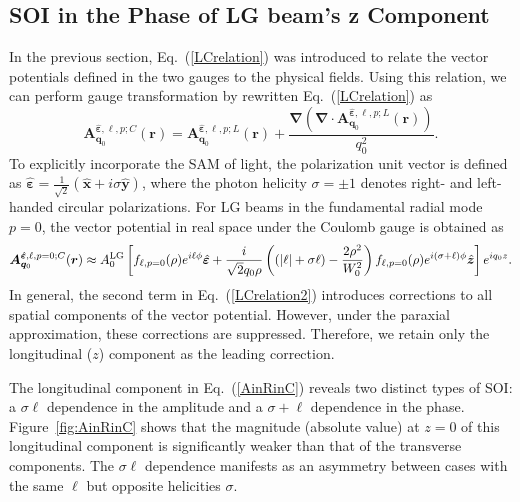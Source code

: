 %
%
%
%
%
%

\subsection{SOI in the Phase of LG beam's z Component}

In the previous section, Eq.~(\ref{LCrelation}) was introduced to relate the vector potentials defined in the two gauges to the physical fields. Using this relation, we can perform gauge transformation by rewritten Eq.~(\ref{LCrelation}) as
\begin{equation}
\boldsymbol{A}^{\hat{\boldsymbol{\varepsilon}}, \ell, p; C}_{\boldsymbol{q}_0}(\boldsymbol{r})
=
\boldsymbol{A}^{\hat{\boldsymbol{\varepsilon}}, \ell, p; L}_{\boldsymbol{q}_0}(\boldsymbol{r})
+
\frac{\boldsymbol{\nabla}
\left(
\boldsymbol{\nabla}\cdot
\boldsymbol{A}^{\hat{\boldsymbol{\varepsilon}}, \ell, p; L}_{\boldsymbol{q}_0}(\boldsymbol{r})
\right)}
{q_0^2}.
\label{LCrelation2}
\end{equation}
To explicitly incorporate the SAM of light, the polarization unit vector is defined as $\hat{\boldsymbol{\varepsilon}}=\frac{1}{\sqrt{2}}
\left(\hat{\boldsymbol{x}}+i\sigma \hat{\boldsymbol{y}}\right)$, where the photon helicity $\sigma=\pm1$ denotes right- and left-handed circular polarizations. For LG beams in the fundamental radial mode $p=0$, the vector potential in real space under the Coulomb gauge is obtained as
\begin{equation}
\boldsymbol{A}^{\hat{\boldsymbol{\varepsilon}}, \ell, p=0; C}_{\boldsymbol{q}_0}(\boldsymbol{r})
\approx
A^{\rm LG}_0
\left[
f_{\ell,p=0}(\rho)e^{i\ell \phi}\hat{\boldsymbol{\varepsilon}}
+
\frac{i}{\sqrt{2}q_0\rho}
\left(
(|\ell|+\sigma \ell)-\frac{2\rho^2}{W_0^2}
\right)
f_{\ell,p=0}(\rho)
e^{i(\sigma+\ell)\phi}
\hat{\boldsymbol{z}}
\right]
e^{i q_0 z}.
\label{AinRinC}
\end{equation}
In general, the second term in Eq.~(\ref{LCrelation2}) introduces corrections to all spatial components of the vector potential. However, under the paraxial approximation, these corrections are suppressed. Therefore, we retain only the longitudinal ($z$) component as the leading correction.

The longitudinal component in Eq.~(\ref{AinRinC}) reveals two distinct types of SOI: a $\sigma\ell$ dependence in the amplitude and a $\sigma+\ell$ dependence in the phase. Figure~\ref{fig:AinRinC} shows that the magnitude (absolute value) at $z=0$ of this longitudinal component is significantly weaker than that of the transverse components. The $\sigma\ell$ dependence manifests as an asymmetry between cases with the same $\ell$ but opposite helicities $\sigma$.

